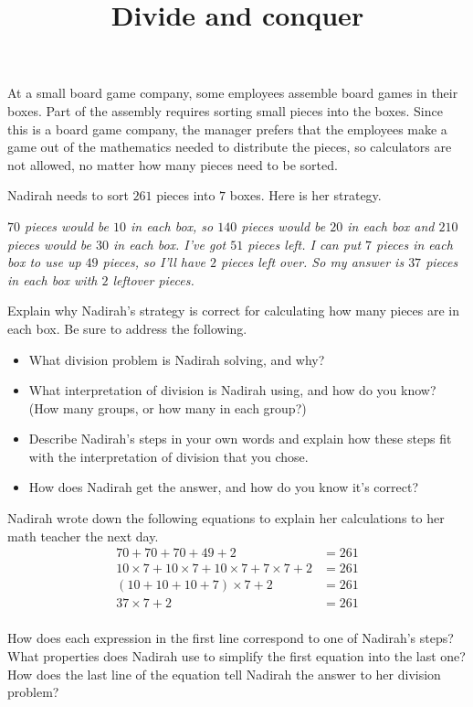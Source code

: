 \documentclass[nooutcomes,noauthor, handout]{ximera}
\title{Divide and conquer}
\begin{document}
\begin{abstract}
\end{abstract}

\maketitle

At a small board game company, some employees assemble board games in their boxes. Part of the assembly requires sorting small pieces into the boxes. Since this is a board game company, the manager prefers that the employees make a game out of the mathematics needed to distribute the pieces, so calculators are not allowed, no matter how many pieces need to be sorted.

\begin{problem}
Nadirah needs to sort $261$ pieces into $7$ boxes. Here is her strategy. 

\emph{$70$ pieces would be $10$ in each box, so $140$ pieces would be $20$ in each box and $210$ pieces would be $30$ in each box. I've got $51$ pieces left. I can put $7$ pieces in each box to use up $49$ pieces, so I'll have $2$ pieces left over. So my answer is $37$ pieces in each box with $2$ leftover pieces.}

Explain why Nadirah's strategy is correct for calculating how many pieces are in each box. Be sure to address the following.
\begin{itemize}
	\item What division problem is Nadirah solving, and why?
	\item What interpretation of division is Nadirah using, and how do you know? (How many groups, or how many in each group?)
	\item Describe Nadirah's steps in your own words and explain how these steps fit with the interpretation of division that you chose.
	\item How does Nadirah get the answer, and how do you know it's correct?
\end{itemize}
\end{problem}


\begin{problem}
Nadirah wrote down the following equations to explain her calculations to her math teacher the next day.
\begin{align*}
70 + 70 + 70 + 49 + 2 &= 261 \\
10 \times 7 + 10 \times 7 + 10 \times 7 + 7 \times 7 + 2 &= 261 \\
(10 + 10 + 10 + 7) \times 7 + 2 &= 261 \\
37 \times 7 + 2 &= 261 \\
\end{align*}

How does each expression in the first line correspond to one of Nadirah's steps? What properties does Nadirah use to simplify the first equation into the last one? How does the last line of the equation tell Nadirah the answer to her division problem?


\end{problem}
\end{document}
